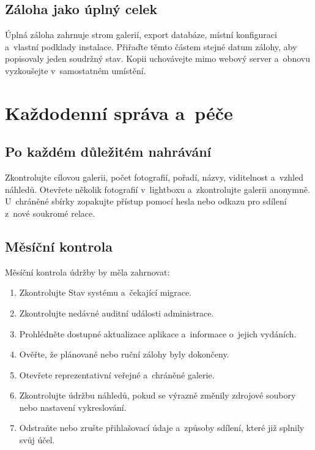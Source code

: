 \documentclass[11pt,a4paper]{article}
\begin{document}
\subsection{Záloha jako úplný celek}

Úplná záloha zahrnuje strom galerií, export databáze, místní konfiguraci
a~vlastní podklady instalace. Přiřaďte těmto částem stejné datum zálohy, aby
popisovaly jeden soudržný stav. Kopii uchovávejte mimo webový server a~obnovu
vyzkoušejte v~samostatném umístění.
\section{Každodenní správa a~péče}
\label{sec:daily-care}

\subsection{Po každém důležitém nahrávání}

Zkontrolujte cílovou galerii, počet fotografií, pořadí, názvy, viditelnost
a~vzhled náhledů. Otevřete několik fotografií v~lightboxu a~zkontrolujte galerii
anonymně. U~chráněné sbírky zopakujte přístup pomocí hesla nebo odkazu pro
sdílení z~nové soukromé relace.

\subsection{Měsíční kontrola}

Měsíční kontrola údržby by měla zahrnovat:

\begin{enumerate}
  \item Zkontrolujte Stav systému a~čekající migrace.
  \item Zkontrolujte nedávné auditní události administrace.
  \item Prohlédněte dostupné aktualizace aplikace a~informace o~jejich vydáních.
  \item Ověřte, že plánované nebo ruční zálohy byly dokončeny.
  \item Otevřete reprezentativní veřejné a~chráněné galerie.
  \item Zkontrolujte údržbu náhledů, pokud se výrazně změnily zdrojové soubory
  nebo nastavení vykreslování.
  \item Odstraňte nebo zrušte přihlašovací údaje a~způsoby sdílení, které již
  splnily svůj účel.
\end{enumerate}
\end{document}
